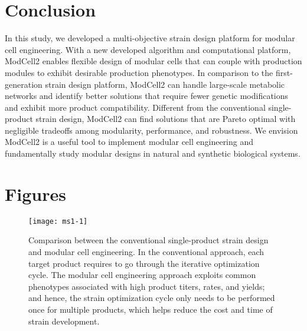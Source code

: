 \section{Conclusion}

In this study, we developed a multi-objective strain design platform for modular cell engineering.
With a new developed algorithm and computational platform, ModCell2 enables flexible design of modular cells that can couple with production modules to exhibit desirable production phenotypes.
In comparison to the first-generation strain design platform, ModCell2 can handle large-scale metabolic networks and identify better solutions that require fewer genetic modifications and exhibit more product compatibility.
Different from the conventional single-product strain design, ModCell2 can find solutions that are Pareto optimal with negligible tradeoffs among modularity, performance, and robustness.
We envision ModCell2 is a useful tool to implement modular cell engineering and fundamentally study modular designs in natural and synthetic biological systems.

%
%


\section*{Figures}

\begin{figure}[h]
  \centering
  \texttt{[image: ms1-1]}
    \caption[Comparison between the conventional single-product strain design and modular cell engineering]{
Comparison between the conventional single-product
strain design and modular cell engineering. In the conventional
approach, each target product requires to go through the iterative
optimization cycle. The modular cell engineering approach exploits
common phenotypes associated with high product titers, rates, and
yields; and hence, the strain optimization cycle only needs to be
performed once for multiple products, which helps reduce the cost and
time of strain development.
    }
    \label{fig:ms1-fig1}
\end{figure}


